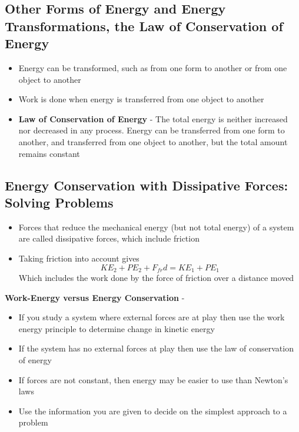 \subsection{Other Forms of Energy and Energy Transformations, the Law of
Conservation of Energy}
\begin{itemize}
    \item Energy can be transformed, such as from one form to another or from one object to another
    \item Work is done when energy is transferred from one object to another
    \item \textbf{Law of Conservation of Energy} - The total energy is neither increased nor decreased in any process. Energy can be transferred from one form to another, and transferred from one object to another, but the total amount remains constant
\end{itemize}

\subsection{Energy Conservation with Dissipative Forces: Solving Problems}
\begin{itemize}
    \item Forces that reduce the mechanical energy (but not total energy) of a system are called dissipative forces, which include friction
    \item Taking friction into account gives \[KE_2+PE_2+F_{fr}d=KE_1+PE_1\]
    Which includes the work done by the force of friction over a distance moved
\end{itemize}

\textbf{Work-Energy versus Energy Conservation} - 
\begin{itemize}
    \item If you study a system where external forces are at play then use the work energy principle to determine change in kinetic energy
    \item If the system has no external forces at play then use the law of conservation of energy
    \item If forces are not constant, then energy may be easier to use than Newton's laws
    \item Use the information you are given to decide on the simplest approach to a problem
\end{itemize}

